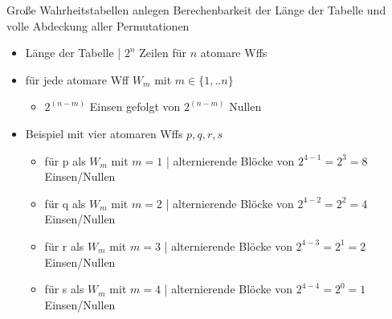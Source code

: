 \begin{frame}
  {Große Wahrheitstabellen anlegen}
  \onslide<+->
  \onslide<+->
  Berechenbarkeit der \alert{Länge der Tabelle} und \alert{volle Abdeckung aller Permutationen}\\
  \Halbzeile
  \begin{itemize}[<+->]
    \item Länge der Tabelle | \alert{$2^n$ Zeilen} für \alert{$n$ atomare Wffs}
      \Halbzeile
    \item für jede atomare Wff $W_m$ mit $m\in\{1, .. n\}$
      \begin{itemize}[<+->]
        \item \alert{$2^{(n-m)}$ Einsen} gefolgt von \alert{$2^{(n-m)}$ Nullen}
      \end{itemize}
      \Halbzeile
    \item Beispiel mit \alert{vier atomaren Wffs} $p,q,r,s$
      \begin{itemize}[<+->]
        \item für \alert{p} als $W_m$ mit \alert{$m=1$} | alternierende Blöcke von \alert{$2^{4-1}=2^{3}=8$} Einsen\slash Nullen
        \item für \alert{q} als $W_m$ mit \alert{$m=2$} | alternierende Blöcke von \alert{$2^{4-2}=2^{2}=4$} Einsen\slash Nullen
        \item für \alert{r} als $W_m$ mit \alert{$m=3$} | alternierende Blöcke von \alert{$2^{4-3}=2^{1}=2$} Einsen\slash Nullen
        \item für \alert{s} als $W_m$ mit \alert{$m=4$} | alternierende Blöcke von \alert{$2^{4-4}=2^{0}=1$} Einsen\slash Nullen
      \end{itemize}
  \end{itemize}
\end{frame}

